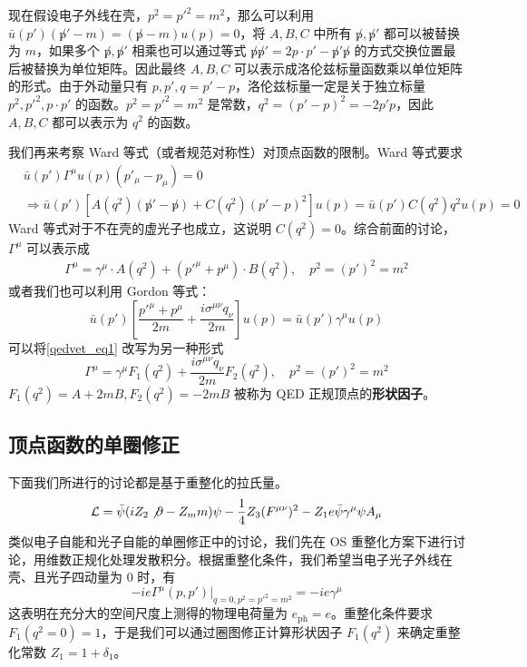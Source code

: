 现在假设电子外线在壳，$p^2=p'^2=m^2$，那么可以利用 $\bar u(p')(\not p'-m)= (\not p-m)u(p)=0$，将 $A,B,C$ 中所有 $\not p,\not p'$ 都可以被替换为 $m$，如果多个 $\not p,\not p'$ 相乘也可以通过等式 $\not p\not p'=2p\cdot p'-\not p'\not p$ 的方式交换位置最后被替换为单位矩阵。因此最终 $A,B,C$ 可以表示成洛伦兹标量函数乘以单位矩阵的形式。由于外动量只有 $p,p',q=p'-p$，洛伦兹标量一定是关于独立标量 $p^2,{p'}^2,p\cdot p'$ 的函数。$p^2={p'}^2=m^2$ 是常数，$q^2=(p'-p)^2 = -2p'p$，因此 $A,B,C$ 都可以表示为 $q^2$ 的函数。

我们再来考察 Ward 等式（或者规范对称性）对顶点函数的限制。Ward 等式要求
\begin{equation}
\begin{aligned}
&\bar u(p')\Gamma^\mu u(p) (p'_\mu-p_\mu) = 0\\
&\Rightarrow \bar u(p')\left[A(q^2)(\not p'-\not p)+ C(q^2)(p'-p)^2\right] u(p)=\bar u(p')C(q^2)q^2 u(p)=0
\end{aligned}
\end{equation}
Ward 等式对于不在壳的虚光子也成立，这说明 $C(q^2) = 0$。综合前面的讨论，$\Gamma^\mu$ 可以表示成
\begin{equation}\label{qedvet_eq1}
\begin{aligned}
\Gamma^\mu = \gamma^\mu\cdot A(q^2) + ({p'}^\mu + p^\mu)\cdot B(q^2),\quad p^2=(p')^2=m^2
\end{aligned}
\end{equation}
或者我们也可以利用 Gordon 等式：
\begin{equation}
\bar u(p') \left[\frac{{p'}^\mu+p^\mu}{2m}+\frac{i\sigma^{\mu\nu}q_\nu}{2m}\right]u(p)=\bar u(p')\gamma^\mu u(p)
\end{equation}
可以将\autoref{qedvet_eq1} 改写为另一种形式
\begin{equation}
\Gamma^\mu = \gamma^\mu F_1(q^2) + \frac{i\sigma^{\mu\nu}q_\nu}{2m} F_2(q^2),\quad p^2=(p')^2=m^2
\end{equation}
$F_1(q^2) = A+2mB,F_2(q^2)=-2mB$ 被称为 QED 正规顶点的\textbf{形状因子}。
\subsection{顶点函数的单圈修正}
下面我们所进行的讨论都是基于重整化的拉氏量。
\begin{equation}
\mathcal{L}=\bar\psi (iZ_2\not\partial - Z_m m)\psi - \frac{1}{4}Z_3 (F^{\mu\nu})^2-Z_1 e \bar\psi \gamma^\mu\psi A_\mu
\end{equation}
类似电子自能和光子自能的单圈修正中的讨论，我们先在 OS 重整化方案下进行讨论，用维数正规化处理发散积分。根据重整化条件，我们希望当电子光子外线在壳、且光子四动量为 $0$ 时，有
\begin{equation}
-ie\Gamma^\mu(p,p')|_{q=0,p^2={p'}^2=m^2} = -ie\gamma^\mu
\end{equation}
这表明在充分大的空间尺度上测得的物理电荷量为 $e_{\text{ph}}=e$。重整化条件要求 $F_1(q^2=0)=1$，于是我们可以通过圈图修正计算形状因子 $F_1(q^2)$ 来确定重整化常数 $Z_1 = 1+\delta_1$。

